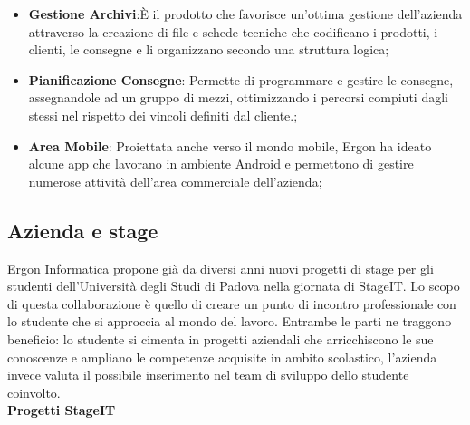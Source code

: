 \begin{itemize}
	\item \textbf{Gestione Archivi}:È il prodotto che favorisce un’ottima gestione dell’azienda attraverso la creazione di file e schede tecniche che codificano i prodotti, i clienti, le consegne e li organizzano secondo una struttura logica;
	
	\item \textbf{Pianificazione Consegne}: Permette di programmare e gestire le consegne, assegnandole ad un gruppo di mezzi, ottimizzando i percorsi compiuti dagli stessi nel rispetto dei vincoli definiti dal cliente.;
	
	\item \textbf{Area Mobile}: Proiettata anche verso il mondo mobile, Ergon ha ideato alcune app che lavorano in ambiente Android e permettono di gestire numerose attività dell'area commerciale dell'azienda;
	
	
\end{itemize}

\subsection{Azienda e stage}

Ergon Informatica propone già da diversi anni nuovi progetti di stage per gli studenti dell'Università degli Studi di Padova nella giornata di StageIT. Lo scopo di questa collaborazione è quello di creare un punto di incontro professionale con lo studente che si approccia al mondo del lavoro. Entrambe le parti ne traggono beneficio: lo studente si cimenta in progetti aziendali che arricchiscono le sue conoscenze e ampliano le competenze acquisite in ambito scolastico, l'azienda invece valuta il possibile inserimento nel team di sviluppo dello studente coinvolto.\\

\textbf{Progetti StageIT}


